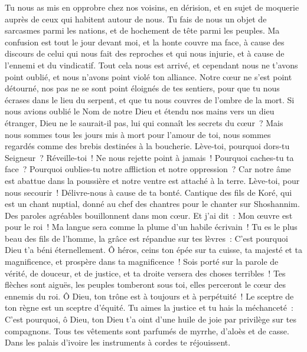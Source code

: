 \begin{multicols}{2}
Tu nous as mis en opprobre chez nos voisins, en dérision, et en sujet de moquerie auprès de ceux qui habitent autour de nous.
Tu fais de nous un objet de sarcasmes parmi les nations, et de hochement de tête parmi les peuples.
Ma confusion est tout le jour devant moi, et la honte couvre ma face,
à cause des discours de celui qui nous fait des reproches et qui nous injurie, et à cause de l'ennemi et du vindicatif.
Tout cela nous est arrivé, et cependant nous ne t'avons point oublié, et nous n'avons point violé ton alliance.
Notre cœur ne s'est point détourné, nos pas ne se sont point éloignés de tes sentiers,
pour que tu nous écrases dans le lieu du serpent, et que tu nous couvres de l'ombre de la mort.
Si nous avions oublié le Nom de notre Dieu et étendu nos mains vers un dieu étranger,
Dieu ne le saurait-il pas, lui qui connaît les secrets du cœur~?
Mais nous sommes tous les jours mis à mort pour l'amour de toi, nous sommes regardés comme des brebis destinées à la boucherie.
Lève-toi, pourquoi dors-tu Seigneur~? Réveille-toi~! Ne nous rejette point à jamais~!
Pourquoi caches-tu ta face~? Pourquoi oublies-tu notre affliction et notre oppression~?
Car notre âme est abattue dans la poussière et notre ventre est attaché à la terre.
Lève-toi, pour nous secourir~! Délivre-nous à cause de ta bonté.
\VerseOne{}Cantique des fils de Koré, qui est un chant nuptial, donné au chef des chantres pour le chanter sur Shoshannim.
Des paroles agréables bouillonnent dans mon cœur. Et j'ai dit~: Mon œuvre est pour le roi~! Ma langue sera comme la plume d'un habile écrivain~!
Tu es le plus beau des fils de l'homme, la grâce est répandue sur tes lèvres~: C'est pourquoi Dieu t'a béni éternellement.
Ô héros, ceins ton épée sur ta cuisse, ta majesté et ta magnificence,
et prospère dans ta magnificence~! Sois porté sur la parole de vérité, de douceur, et de justice, et ta droite versera des choses terribles~!
Tes flèches sont aiguës, les peuples tomberont sous toi, elles perceront le cœur des ennemis du roi.
Ô Dieu, ton trône est à toujours et à perpétuité~! Le sceptre de ton règne est un sceptre d'équité.
Tu aimes la justice et tu hais la méchanceté~: C'est pourquoi, ô Dieu, ton Dieu t'a oint d'une huile de joie par privilège sur tes compagnons.
Tous tes vêtements sont parfumés de myrrhe, d'aloès et de casse. Dans les palais d'ivoire les instruments à cordes te réjouissent.

\end{multicols}
